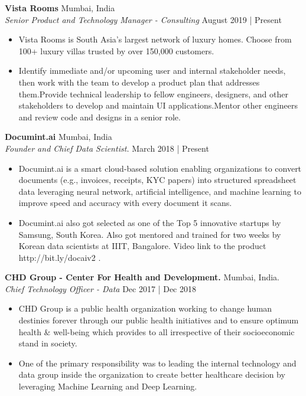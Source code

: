 \documentclass[a4paper]{article}
\begin{document}
\textbf{Vista Rooms} \hfill Mumbai, India\\
\textit{Senior Product and Technology Manager - Consulting} \hfill August 2019 | Present\\
\vspace{-1mm}
\begin{itemize} \itemsep 1pt
	\item Vista Rooms is South Asia's largest network of luxury homes. Choose from 100+ luxury villas trusted by over 150,000 customers.
	\item Identify immediate and/or upcoming user and internal stakeholder needs, then work with the team to develop a product plan that addresses them.Provide technical leadership to fellow engineers, designers, and other stakeholders to develop and maintain UI applications.Mentor other engineers and review code and designs in a senior role.
\end{itemize}
\textbf{Documint.ai} \hfill Mumbai, India\\
\textit{Founder and Chief Data Scientist.} \hfill March 2018 | Present\\
\vspace{-1mm}
\begin{itemize} \itemsep 1pt
	\item Documint.ai is a smart cloud-based solution enabling organizations to convert documents (e.g., invoices, receipts, KYC papers) into structured spreadsheet data leveraging neural network, artificial intelligence, and machine learning to improve speed and accuracy with every document it scans.
	\item Documint.ai also got selected as one of the Top 5 innovative startups by Samsung, South Korea. Also got mentored and trained for two weeks by Korean data scientists at IIIT, Bangalore. Video link to the product http://bit.ly/docaiv2 .
\end{itemize}
\textbf{CHD Group - Center For Health and Development.} \hfill Mumbai, India.\\
\textit{Chief Technology Officer - Data} \hfill Dec 2017 | Dec 2018\\
\vspace{-1mm}
\begin{itemize} \itemsep 1pt
	\item CHD Group is a public health organization working to change human destinies forever through our public health initiatives and to ensure optimum health \& well-being which provides to all irrespective of their socioeconomic stand in society.
	\item One of the primary responsibility was to leading the internal technology and data group inside the organization to create better healthcare decision by leveraging Machine Learning and Deep Learning.
\end{itemize}
\end{document}
